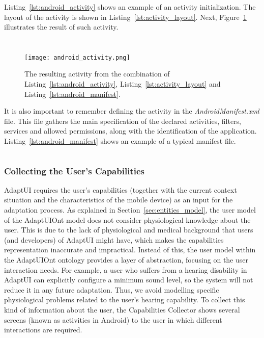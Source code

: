 Listing~\ref{lst:android_activity} shows an example of an activity initialization.
The layout of the activity is shown in Listing~\ref{lst:activity_layout}. Next,
Figure~\ref{fig:android_activity} illustrates the result of such activity.

\inputminted[linenos=true, fontsize=\footnotesize, frame=lines]{java}{4_system_architecture/android_activity.java}

\inputminted[linenos=true, fontsize=\footnotesize, frame=lines]{xml}{4_system_architecture/activity_layout.xml}

\begin{figure}
\centering
\texttt{[image: android\_activity.png]}
\caption{The resulting activity from the combination of Listing~\ref{lst:android_activity},
Listing~\ref{lst:activity_layout} and Listing~\ref{lst:android_manifest}.}
\label{fig:android_activity}
\end{figure}

It is also important to remember defining the activity in the \textit{AndroidManifest.xml}
file. This file gathers the main specification of the declared activities, filters,
services and allowed permissions, along with the identification of the application.
Listing~\ref{lst:android_manifest} shows an example of a typical manifest file.

\inputminted[linenos=true, fontsize=\footnotesize, frame=lines]{xml}{4_system_architecture/android_manifest.xml}

\subsubsection{Collecting the User's Capabilities}
\label{sec:user_capabilities}

AdaptUI requires the user's capabilities (together with the current context
situation and the characteristics of the mobile device) as an input  for the
adaptation process. As explained in Section~\ref{sec:entities_model}, the user
model of the AdaptUIOnt model does not consider physiological knowledge about
the user. This is due to the lack of physiological and medical background that
users (and developers) of AdaptUI might have, which makes the capabilities
representation inaccurate and impractical. Instead of this, the user model
within the AdaptUIOnt ontology provides a layer of abstraction, focusing on the
user interaction needs. For example, a user who suffers from a hearing disability
in AdaptUI can explicitly configure a minimum sound level, so the system will
not reduce it in any future adaptation. Thus, we avoid modelling specific
physiological problems related to the user's hearing capability. To collect this
kind of information about the user, the Capabilities Collector shows several
screens (known as activities in Android) to the user in which different
interactions are required. 

